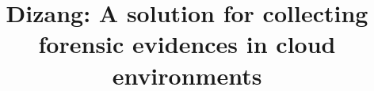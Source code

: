 \documentclass[twocolumn, notitlepage]{bmcart}%
\newcommand{\fancyname}{Dizang}
\begin{document}
\begin{frontmatter}

\begin{fmbox}


\title{\fancyname: A solution for collecting forensic evidences in cloud environments}


\author[
   addressref={aff1},                   %
   corref={aff1},                       %
   email={hamiltonii@gmail.com}   %
]{ }
\author[
   addressref={aff1},
   corref={aff1},                       %
   noteref={n1},                        %
   email={mjunior@larc.usp.br}
]{ }


\address[id=aff1]{%
  , %
  ,                     %
  ,                              %
}


\end{fmbox}
\end{frontmatter}
\end{document}
